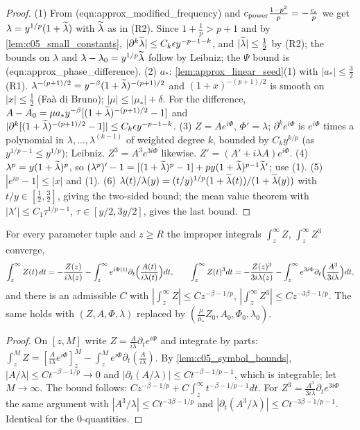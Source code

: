 \begin{proof}
  (1) From (eqn:approx\_modified\_frequency) and $c_{\textup{power}}\frac{1-p^2}{p}=-\frac{c_\epsilon}{p}$ we get
  $\lambda=y^{1/p}(1+\widetilde{\lambda})$ with $\widetilde{\lambda}$ as in (R2). Since $1+\frac1p>p+1$ and by \cref{lem:c05_small_constants},
  $|\partial^k\widetilde{\lambda}|\le C_k\epsilon y^{-p-1-k}$, and $|\widetilde{\lambda}|\le\frac12$ by (R2); the bounds on $\lambda$ and
  $\lambda-\lambda_0=y^{1/p}\widetilde{\lambda}$ follow by Leibniz; the $\Psi$ bound is (eqn:approx\_phase\_difference).
  (2) $a_*$: \cref{lem:approx_linear_seed}(1) with $|a_*|\le\frac32$ (R1). $\lambda^{-(p+1)/2}=y^{-\beta}(1+\widetilde{\lambda})^{-(p+1)/2}$
  and $(1+x)^{-(p+1)/2}$ is smooth on $|x|\le\frac12$ (Fa\`a di Bruno); $|\mu|\le|\mu_*|+\delta$. For the difference,
  $A-A_0=\mu a_*y^{-\beta}[(1+\widetilde{\lambda})^{-(p+1)/2}-1]$ and $|\partial^k[(1+\widetilde{\lambda})^{-(p+1)/2}-1]|\le C_k\epsilon y^{-p-1-k}$.
  (3) $Z=Ae^{i\Phi}$, $\Phi'=\lambda$; $\partial^ke^{i\Phi}$ is $e^{i\Phi}$ times a polynomial in $\lambda,\dots,\lambda^{(k-1)}$ of
  weighted degree $k$, bounded by $C_ky^{k/p}$ (as $y^{1/p-1}\le y^{1/p}$); Leibniz. $Z^3=A^3e^{3i\Phi}$ likewise. $Z'=(A'+i\lambda A)e^{i\Phi}$.
  (4) $\lambda^p=y(1+\widetilde{\lambda})^p$, so $(\lambda^p)'-1=[(1+\widetilde{\lambda})^p-1]+py(1+\widetilde{\lambda})^{p-1}\widetilde{\lambda}'$; use (1).
  (5) $|e^{ix}-1|\le|x|$ and (1). (6) $\lambda(t)/\lambda(y)=(t/y)^{1/p}(1+\widetilde{\lambda}(t))/(1+\widetilde{\lambda}(y))$ with
  $t/y\in[\frac12,\frac32]$, giving the two-sided bound; the mean value theorem with $|\lambda'|\le C_1\tau^{1/p-1}$,
  $\tau\in[y/2,3y/2]$, gives the last bound.
\end{proof}

\begin{lemma}
  \label{lem:c05_primitive}
  For every parameter tuple and $z\ge R$ the improper integrals $\int_z^\infty Z$, $\int_z^\infty Z^3$ converge,
  \[
    \int_z^\infty Z(t)\,dt=-\frac{Z(z)}{i\lambda(z)}-\int_z^\infty e^{i\Phi(t)}\partial_t\Bigl(\frac{A(t)}{i\lambda(t)}\Bigr)dt,\qquad
    \int_z^\infty Z(t)^3dt=-\frac{Z(z)^3}{3i\lambda(z)}-\int_z^\infty e^{3i\Phi}\partial_t\Bigl(\frac{A^3}{3i\lambda}\Bigr)dt,
  \]
  and there is an admissible $C$ with $|\int_z^\infty Z|\le Cz^{-\beta-1/p}$, $|\int_z^\infty Z^3|\le Cz^{-3\beta-1/p}$.
  The same holds with $(Z,A,\Phi,\lambda)$ replaced by $(\frac{\mu}{\mu_*}Z_0,A_0,\Phi_0,\lambda_0)$.
\end{lemma}
\begin{proof}
  On $[z,M]$ write $Z=\frac{A}{i\lambda}\partial_te^{i\Phi}$ and integrate by parts:
  $\int_z^MZ=[\frac{A}{i\lambda}e^{i\Phi}]_z^M-\int_z^Me^{i\Phi}\partial_t(\frac{A}{i\lambda})$. By \cref{lem:c05_symbol_bounds},
  $|A/\lambda|\le Ct^{-\beta-1/p}\to0$ and $|\partial_t(A/\lambda)|\le Ct^{-\beta-1/p-1}$, which is integrable; let $M\to\infty$.
  The bound follows: $Cz^{-\beta-1/p}+C\int_z^\infty t^{-\beta-1/p-1}dt$. For $Z^3=\frac{A^3}{3i\lambda}\partial_te^{3i\Phi}$ the same
  argument with $|A^3/\lambda|\le Ct^{-3\beta-1/p}$ and $|\partial_t(A^3/\lambda)|\le Ct^{-3\beta-1/p-1}$. Identical for the $0$-quantities.
\end{proof}

